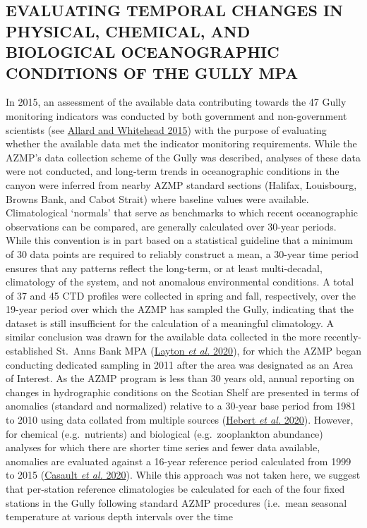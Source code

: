 \documentclass[12pt]{article}\usepackage[]{graphicx}\usepackage[]{color}
\begin{document}
\hypertarget{evaluating-temporal-changes-in-physical-chemical-and-biological-oceanographic-conditions-of-the-gully-mpa}{%
\subsection{\texorpdfstring{\textbf{EVALUATING TEMPORAL CHANGES IN PHYSICAL, CHEMICAL, AND BIOLOGICAL OCEANOGRAPHIC CONDITIONS OF THE GULLY MPA}}{EVALUATING TEMPORAL CHANGES IN PHYSICAL, CHEMICAL, AND BIOLOGICAL OCEANOGRAPHIC CONDITIONS OF THE GULLY MPA}}\label{evaluating-temporal-changes-in-physical-chemical-and-biological-oceanographic-conditions-of-the-gully-mpa}}

In 2015, an assessment of the available data contributing towards the 47 Gully monitoring indicators was conducted by both government and non-government scientists (see \protect\hyperlink{ref-allard_2015}{Allard and Whitehead 2015}) with the purpose of evaluating whether the available data met the indicator monitoring requirements. While the AZMP's data collection scheme of the Gully was described, analyses of these data were not conducted, and long-term trends in oceanographic conditions in the canyon were inferred from nearby AZMP standard sections (Halifax, Louisbourg, Browns Bank, and Cabot Strait) where baseline values were available. Climatological `normals' that serve as benchmarks to which recent oceanographic observations can be compared, are generally calculated over 30-year periods. While this convention is in part based on a statistical guideline that a minimum of 30 data points are required to reliably construct a mean, a 30-year time period ensures that any patterns reflect the long-term, or at least multi-decadal, climatology of the system, and not anomalous environmental conditions. A total of 37 and 45 CTD profiles were collected in spring and fall, respectively, over the 19-year period over which the AZMP has sampled the Gully, indicating that the dataset is still insufficient for the calculation of a meaningful climatology. A similar conclusion was drawn for the available data collected in the more recently-established St.~Anns Bank MPA (\protect\hyperlink{ref-layton_2020}{Layton \textit{et al.} 2020}), for which the AZMP began conducting dedicated sampling in 2011 after the area was designated as an Area of Interest. As the AZMP program is less than 30 years old, annual reporting on changes in hydrographic conditions on the Scotian Shelf are presented in terms of anomalies (standard and normalized) relative to a 30-year base period from 1981 to 2010 using data collated from multiple sources (\protect\hyperlink{ref-hebert_2020}{Hebert \textit{et al.} 2020}). However, for chemical (e.g.~nutrients) and biological (e.g.~zooplankton abundance) analyses for which there are shorter time series and fewer data available, anomalies are evaluated against a 16-year reference period calculated from 1999 to 2015 (\protect\hyperlink{ref-casault_2020}{Casault \textit{et al.} 2020}). While this approach was not taken here, we suggest that per-station reference climatologies be calculated for each of the four fixed stations in the Gully following standard AZMP procedures (i.e.~mean seasonal temperature at various depth intervals over the time 
\end{document}

